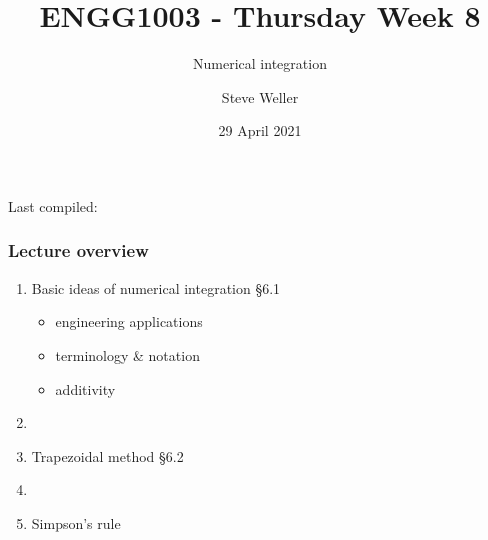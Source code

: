 \documentclass[english,14pt]{beamer}
\title{ENGG1003 - Thursday Week 8}
\subtitle{Numerical integration }%
\author{Steve Weller}
\institute{University of Newcastle}
\date{29 April 2021}
\newcommand\red[1]{{\color{red} #1}}
\begin{document}
\begin{flushleft}
{\scriptsize Last compiled:~\DTMnow}
\vspace*{-5mm}
\end{flushleft}
\framebreak


\begin{frame}[fragile]

\frametitle{Lecture overview}
\begin{enumerate}
	\item Basic ideas of numerical integration \red{\S6.1}
	\begin{itemize}
		\item engineering applications
		\item terminology \& notation
		\item additivity
	\end{itemize}
	
	\item[]
	
	\item Trapezoidal method \red{\S6.2}
	
%	
	
	\item[]
	
	\item Simpson's rule
	
\end{enumerate}

\end{frame}

\end{document}
